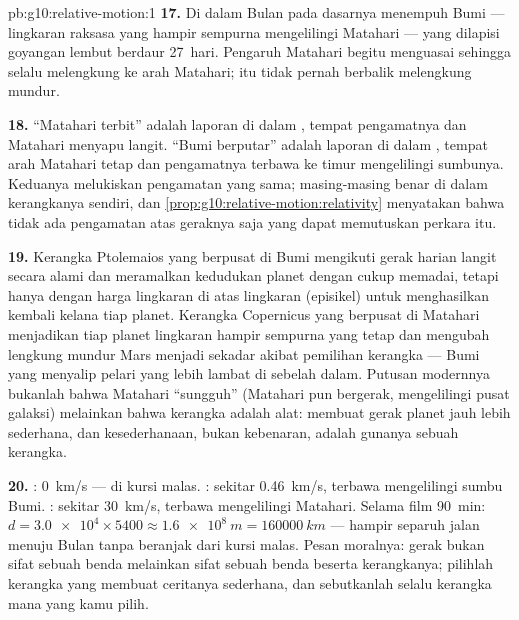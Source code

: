 \begin{solution}{pb:g10:relative-motion:1}
\textbf{17.} Di dalam  Bulan pada dasarnya
menempuh  Bumi --- lingkaran raksasa yang hampir sempurna
mengelilingi Matahari --- yang dilapisi goyangan lembut berdaur
\qty{27}{hari}. Pengaruh Matahari begitu menguasai sehingga 
selalu melengkung ke arah Matahari;  itu tidak pernah berbalik
melengkung mundur.

\textbf{18.} ``Matahari terbit'' adalah laporan di dalam , tempat pengamatnya  dan Matahari menyapu langit. ``Bumi
berputar'' adalah laporan di dalam , tempat arah
Matahari tetap dan pengamatnya terbawa ke timur mengelilingi sumbunya.
Keduanya melukiskan pengamatan yang sama; masing-masing benar di dalam
kerangkanya sendiri, dan
\cref{prop:g10:relative-motion:relativity} menyatakan bahwa tidak ada
pengamatan atas geraknya saja yang dapat memutuskan perkara itu.

\textbf{19.} Kerangka Ptolemaios yang berpusat di Bumi mengikuti gerak
harian langit secara alami dan meramalkan kedudukan planet dengan cukup
memadai, tetapi hanya dengan harga lingkaran di atas lingkaran
(episikel) untuk menghasilkan kembali kelana tiap planet. Kerangka
Copernicus yang berpusat di Matahari menjadikan tiap planet lingkaran
hampir sempurna yang tetap dan mengubah lengkung mundur Mars menjadi
sekadar akibat pemilihan kerangka --- Bumi yang menyalip pelari yang
lebih lambat di  sebelah dalam. Putusan modernnya bukanlah
bahwa Matahari ``sungguh''  (Matahari pun bergerak, mengelilingi
pusat galaksi) melainkan bahwa kerangka adalah alat:  membuat gerak planet jauh lebih sederhana, dan
kesederhanaan, bukan kebenaran, adalah gunanya sebuah kerangka.

\textbf{20.} : \qty{0}{km/s} ---  di kursi malas.
: sekitar \qty{0.46}{km/s}, terbawa mengelilingi
sumbu Bumi. : sekitar \qty{30}{km/s}, terbawa
mengelilingi Matahari. Selama film \qty{90}{min}:
$d = \num{3.0e4} \times 5400
\approx \qty{1.6e8}{m} = \qty{160000}{km}$
--- hampir separuh jalan menuju Bulan tanpa beranjak dari kursi malas.
Pesan moralnya: gerak bukan sifat sebuah benda melainkan sifat sebuah
benda beserta kerangkanya; pilihlah kerangka yang membuat ceritanya
sederhana, dan sebutkanlah selalu kerangka mana yang kamu pilih.
\end{solution}
